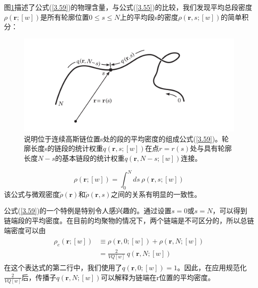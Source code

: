 图\ref{figure1}描述了公式(\ref{3.59})的物理含量，与公式(\ref{3.55})的比较，我们发现平均总段密度$\rho(\mathbf{r};[w])$是所有轮廓位置$0\le s\le N$上的平均段s的密度$\rho(\mathbf{r},s;[w])$的简单积分：

\begin{figure}[H]
\centering
\includegraphics[width=15cm]{./figures/32.png}
\caption{说明位于连续高斯链位置s处的段的平均密度的组成公式(\ref{3.59})。轮廓长度s的链段的统计权重$q(\mathbf{r},s;[w])$在点$r=r(s)$处与具有轮廓长度$N−s$的基本链段的统计权重$q(\mathbf{r},N−s;[w])$连接。}
\label{figure1}
\end{figure}

\begin{equation}\label{3.60}
\rho(\mathbf{r};[w])=\int_{0}^{N}ds~\rho(\mathbf{r},s;[w])
\end{equation}
该公式与微观密度$\tilde{\rho}(\mathbf{r})$和$\tilde{\rho}(\mathbf{r},s)$之间的关系有明显的一致性。

公式(\ref{3.59})的一个特例是特别令人感兴趣的。通过设置$s=0$或$s=N$，可以得到链端段的平均密度。在目前的均聚物的情况下，两个链端是不可区分的，所以总链端密度可以由
\begin{align}\label{3.61}
\begin{split}
\rho_e(\mathbf{r};[w])&\equiv \rho(\mathbf{r},0;[w])+\rho(\mathbf{r},N;[w])\\  &=\frac{2}{VQ[w]}~q(\mathbf{r},N;[w])
\end{split}
\end{align}
在这个表达式的第二行中，我们使用了$q(\mathbf{r},0;[w])=1$。因此，在应用规范化$\frac{2}{VQ[w]}$后，传播子$q(\mathbf{r},N;[w])$可以解释为链端在r位置的平均密度。

